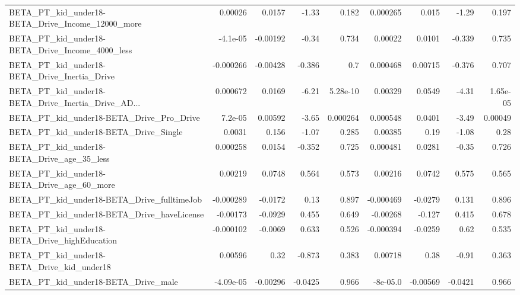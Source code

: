\begin{tabular}{lrrrrrrrr}
BETA\_PT\_kid\_under18-BETA\_Drive\_Income\_12000\_more   &     0.00026 &       0.0157 &    -1.33 &    0.182 &   0.000265 &       0.015 &        -1.29 &         0.197 \\
BETA\_PT\_kid\_under18-BETA\_Drive\_Income\_4000\_less    &    -4.1e-05 &     -0.00192 &    -0.34 &    0.734 &    0.00022 &      0.0101 &       -0.339 &         0.735 \\
BETA\_PT\_kid\_under18-BETA\_Drive\_Inertia\_Drive       &   -0.000266 &     -0.00428 &   -0.386 &      0.7 &   0.000468 &     0.00715 &       -0.376 &         0.707 \\
BETA\_PT\_kid\_under18-BETA\_Drive\_Inertia\_Drive\_AD... &    0.000672 &       0.0169 &    -6.21 & 5.28e-10 &    0.00329 &      0.0549 &        -4.31 &      1.65e-05 \\
BETA\_PT\_kid\_under18-BETA\_Drive\_Pro\_Drive           &     7.2e-05 &      0.00592 &    -3.65 & 0.000264 &   0.000548 &      0.0401 &        -3.49 &       0.00049 \\
BETA\_PT\_kid\_under18-BETA\_Drive\_Single              &      0.0031 &        0.156 &    -1.07 &    0.285 &    0.00385 &        0.19 &        -1.08 &          0.28 \\
BETA\_PT\_kid\_under18-BETA\_Drive\_age\_35\_less         &    0.000258 &       0.0154 &   -0.352 &    0.725 &   0.000481 &      0.0281 &        -0.35 &         0.726 \\
BETA\_PT\_kid\_under18-BETA\_Drive\_age\_60\_more         &     0.00219 &       0.0748 &    0.564 &    0.573 &    0.00216 &      0.0742 &        0.575 &         0.565 \\
BETA\_PT\_kid\_under18-BETA\_Drive\_fulltimeJob         &   -0.000289 &      -0.0172 &     0.13 &    0.897 &  -0.000469 &     -0.0279 &        0.131 &         0.896 \\
BETA\_PT\_kid\_under18-BETA\_Drive\_haveLicense         &    -0.00173 &      -0.0929 &    0.455 &    0.649 &   -0.00268 &      -0.127 &        0.415 &         0.678 \\
BETA\_PT\_kid\_under18-BETA\_Drive\_highEducation       &   -0.000102 &      -0.0069 &    0.633 &    0.526 &  -0.000394 &     -0.0259 &         0.62 &         0.535 \\
BETA\_PT\_kid\_under18-BETA\_Drive\_kid\_under18         &     0.00596 &         0.32 &   -0.873 &    0.383 &    0.00718 &        0.38 &        -0.91 &         0.363 \\
BETA\_PT\_kid\_under18-BETA\_Drive\_male                &   -4.09e-05 &     -0.00296 &  -0.0425 &    0.966 &   -8e-05.0 &    -0.00569 &      -0.0421 &         0.966 \\

\end{tabular}
